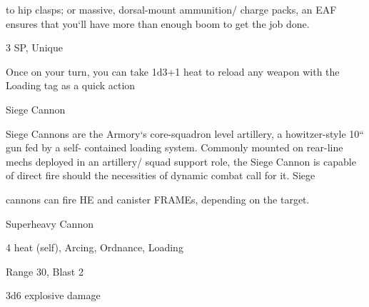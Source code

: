 to hip clasps; or massive, dorsal-mount ammunition/ charge packs, an EAF ensures that you‘ll have more
than enough boom to get the job done.

3 SP, Unique

Once on your turn, you can take 1d3+1 heat to reload any weapon with the Loading tag as a
quick action


Siege Cannon

Siege Cannons are the Armory‘s core-squadron level artillery, a howitzer-style 10“ gun fed by a self-
contained loading system. Commonly mounted on rear-line mechs deployed in an artillery/ squad support
role, the Siege Cannon is capable of direct fire should the necessities of dynamic combat call for it. Siege

cannons can fire HE and canister FRAMEs, depending on the target.

Superheavy Cannon

4 heat (self), Arcing, Ordnance, Loading

Range 30, Blast 2

3d6 explosive damage

